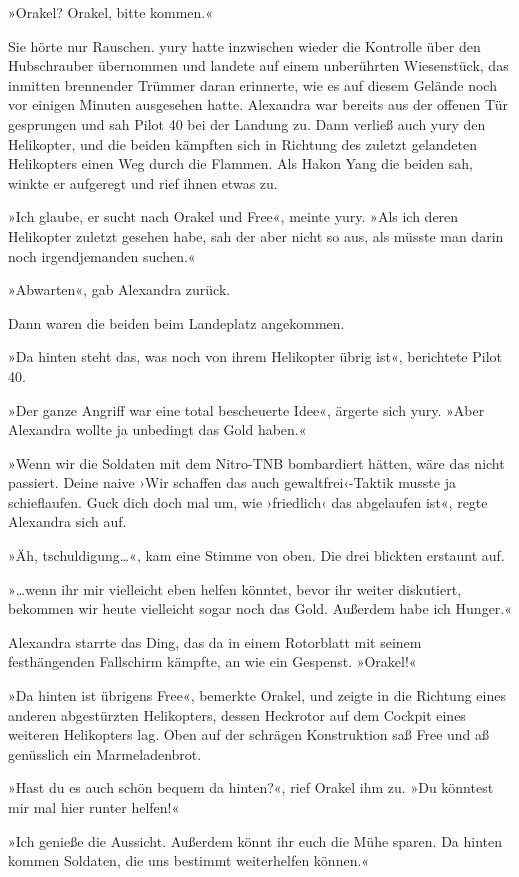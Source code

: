 »Orakel? Orakel, bitte kommen.«

Sie hörte nur Rauschen. yury hatte inzwischen wieder die Kontrolle über den Hubschrauber übernommen und landete auf einem unberührten Wiesenstück, das inmitten brennender Trümmer daran erinnerte, wie es auf diesem Gelände noch vor einigen Minuten ausgesehen hatte. Alexandra war bereits aus der offenen Tür gesprungen und sah Pilot 40 bei der Landung zu. Dann verließ auch yury den Helikopter, und die beiden kämpften sich in Richtung des zuletzt gelandeten Helikopters einen Weg durch die Flammen. Als Hakon Yang die beiden sah, winkte er aufgeregt und rief ihnen etwas zu.

»Ich glaube, er sucht nach Orakel und Free«, meinte yury. »Als ich deren Helikopter zuletzt gesehen habe, sah der aber nicht so aus, als müsste man darin noch irgendjemanden suchen.«

»Abwarten«, gab Alexandra zurück.

Dann waren die beiden beim Landeplatz angekommen.

»Da hinten steht das, was noch von ihrem Helikopter übrig ist«, berichtete Pilot 40.

»Der ganze Angriff war eine total bescheuerte Idee«, ärgerte sich yury. »Aber Alexandra wollte ja unbedingt das Gold haben.«

»Wenn wir die Soldaten mit dem Nitro-TNB bombardiert hätten, wäre das nicht passiert. Deine naive ›Wir schaffen das auch gewaltfrei‹-Taktik musste ja schieflaufen. Guck dich doch mal um, wie ›friedlich‹ das abgelaufen ist«, regte Alexandra sich auf.

»Äh, tschuldigung…«, kam eine Stimme von oben. Die drei blickten erstaunt auf.

»…wenn ihr mir vielleicht eben helfen könntet, bevor ihr weiter diskutiert, bekommen wir heute vielleicht sogar noch das Gold. Außerdem habe ich Hunger.«

Alexandra starrte das Ding, das da in einem Rotorblatt mit seinem festhängenden Fallschirm kämpfte, an wie ein Gespenst. »Orakel!«

»Da hinten ist übrigens Free«, bemerkte Orakel, und zeigte in die Richtung eines anderen abgestürzten Helikopters, dessen Heckrotor auf dem Cockpit eines weiteren Helikopters lag. Oben auf der schrägen Konstruktion saß Free und aß genüsslich ein Marmeladenbrot.

»Hast du es auch schön bequem da hinten?«, rief Orakel ihm zu. »Du könntest mir mal hier runter helfen!«

»Ich genieße die Aussicht. Außerdem könnt ihr euch die Mühe sparen. Da hinten kommen Soldaten, die uns bestimmt weiterhelfen können.«

